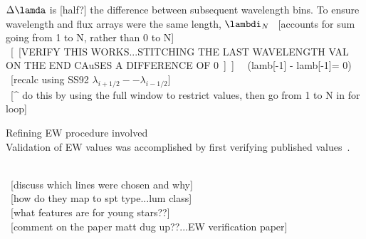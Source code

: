 $\Delta\lamda$ is [half?] the difference between subsequent wavelength bins.  To ensure wavelength and flux arrays were the same length, $\lambdi_{N}$
~[accounts for sum going from 1 to N, rather than 0 to N]\\
~[~[VERIFY THIS WORKS...STITCHING THE LAST WAVELENGTH VAL ON THE END CAuSES A DIFFERENCE OF 0~]~] ~~(lamb[-1] - lamb[-1]= 0)\\

~[recalc using SS92 $\lambda_{i+1/2} -- \lambda_{i-1/2}$]\\
~[^ do this by using the full window to restrict values, then go from 1 to N in for loop]

Refining EW procedure involved \\
Validation of EW values was accomplished by first verifying published values~\cite{Rayner_2009}.  

~\\~[discuss which lines were chosen and why]\\
~[how do they map to spt type...lum class]\\
~[what features are for young stars??]\\
~[comment on the paper matt dug up??...EW verification paper]

